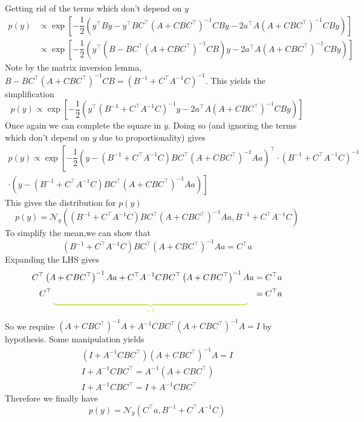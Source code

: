 \documentclass[11pt]{report} %
\begin{document}
Getting rid of the terms which don't depend on $y$
\begin{align}
p\left(y\right) &\propto \exp\left[-\dfrac{1}{2}\left(y^{\top}By-y^{\top}BC^{\top}\left(A+CBC^{\top}\right)^{-1}CBy-2a^{\top}A\left(A+CBC^{\top}\right)^{-1}CBy\right)\right] \\
&\propto \exp\left[-\dfrac{1}{2}\left(y^{\top}\left(B - BC^{\top}\left(A+CBC^{\top}\right)^{-1}CB\right)y-2a^{\top}A\left(A+CBC^{\top}\right)^{-1}CBy\right)\right]
\end{align}
Note by the matrix inversion lemma, $B - BC^{\top}\left(A+CBC^{\top}\right)^{-1}CB = \left(B^{-1} + C^{\top}A^{-1}C\right)^{-1}$. This yields the simplification
\begin{equation}
p\left(y\right) \propto \exp\left[-\dfrac{1}{2}\left(y^{\top}\left(B^{-1} + C^{\top}A^{-1}C\right)^{-1}y-2a^{\top}A\left(A+CBC^{\top}\right)^{-1}CBy\right)\right]
\end{equation}
Once again we can complete the square in $y$. Doing so (and ignoring the terms which don't depend on $y$ due to proportionality) gives
\begin{multline}
p\left(y\right) \propto \exp\left[-\dfrac{1}{2}\left(y - \left(B^{-1} + C^{\top}A^{-1}C\right)BC^{\top}\left(A+CBC^{\top}\right)^{-1}Aa\right)^{\top}\cdot\left(B^{-1} + C^{\top}A^{-1}C\right)^{-1} \right. \\
\left. \cdot\left(y - \left(B^{-1} + C^{\top}A^{-1}C\right)BC^{\top}\left(A+CBC^{\top}\right)^{-1}Aa\right)\right]
\end{multline}
This gives the distribution for $p\left(y\right)$
\begin{equation}
p\left(y\right) = \mathcal{N}_{y}\left(\left(B^{-1} + C^{\top}A^{-1}C\right)BC^{\top}\left(A+CBC^{\top}\right)^{-1}Aa, B^{-1} + C^{\top}A^{-1}C\right)
\end{equation}
To simplify the mean,we can show that
\begin{equation}
\left(B^{-1} + C^{\top}A^{-1}C\right)BC^{\top}\left(A+CBC^{\top}\right)^{-1}Aa = C^{\top}a
\end{equation}
Expanding the LHS gives
\begin{align}
C^{\top}\left(A+CBC^{\top}\right)^{-1}Aa + C^{\top}A^{-1}CBC^{\top}\left(A+CBC^{\top}\right)^{-1}Aa &= C^{\top}a \\
C^{\top}\green\underbrace{\black\left[\left(A+CBC^{\top}\right)^{-1}A + A^{-1}CBC^{\top}\left(A+CBC^{\top}\right)^{-1}A\right]}_{\green=I}\black a &= C^{\top}a
\end{align}
So we require $\left(A+CBC^{\top}\right)^{-1}A + A^{-1}CBC^{\top}\left(A+CBC^{\top}\right)^{-1}A = I$ by hypothesis. Some manipulation yields
\begin{gather}
\left(I + A^{-1}CBC^{\top}\right)\left(A+CBC^{\top}\right)^{-1}A = I \\
I + A^{-1}CBC^{\top} = A^{-1}\left(A+CBC^{\top}\right) \\
I + A^{-1}CBC^{\top} = I + A^{-1}CBC^{\top}
\end{gather}
Therefore we finally have
\begin{equation}
p\left(y\right) = \mathcal{N}_{y}\left(C^{\top}a, B^{-1} + C^{\top}A^{-1}C\right)
\end{equation}
\end{document}
